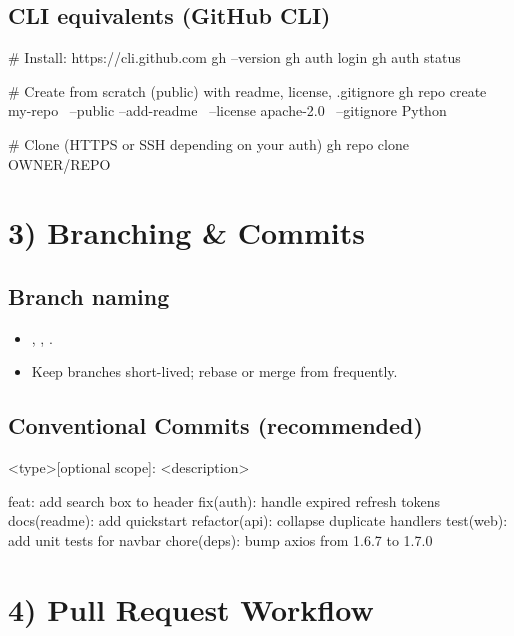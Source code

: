 \documentclass[11pt]{article}
\begin{document}
\subsection*{CLI equivalents (GitHub CLI)}

\begin{bashcode}
# Install: https://cli.github.com
gh --version
gh auth login
gh auth status

# Create from scratch (public) with readme, license, .gitignore
gh repo create my-repo \
  --public --add-readme \
  --license apache-2.0 \
  --gitignore Python

# Clone (HTTPS or SSH depending on your auth)
gh repo clone OWNER/REPO
\end{bashcode}

\section*{3) Branching \& Commits}

\subsection*{Branch naming}

\begin{itemize}
  \item {}, , .
  \item Keep branches short-lived; rebase or merge from  frequently.
\end{itemize}

\subsection*{Conventional Commits (recommended)}

\begin{textcode}
<type>[optional scope]: <description>

feat: add search box to header
fix(auth): handle expired refresh tokens
docs(readme): add quickstart
refactor(api): collapse duplicate handlers
test(web): add unit tests for navbar
chore(deps): bump axios from 1.6.7 to 1.7.0
\end{textcode}

\section*{4) Pull Request Workflow}
\end{document}
